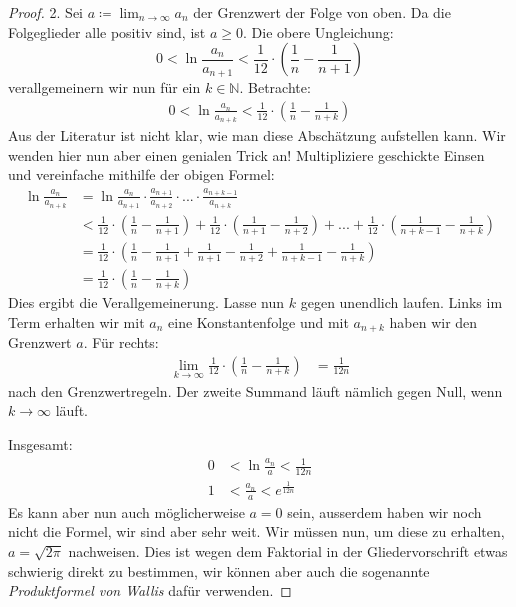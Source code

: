 \documentclass[10pt,fleqn]{article}
\theoremstyle{definition}
\theoremstyle{remark}
\begin{document}
\begin{proof}
    2. Sei \(a \coloneqq \lim_{n\to\infty} a_n\) der Grenzwert der Folge von oben. Da die Folgeglieder alle positiv sind, ist \(a \geq 0\). Die obere Ungleichung:
    \[
        0 < \ln{\frac{a_n}{a_{n+1}}} < \frac{1}{12} \cdot \left(\frac{1}{n}-\frac{1}{n+1}\right)
    \]
    verallgemeinern wir nun für ein \(k \in \mathbb{N}\). Betrachte:
    \begin{align*}
        0 < \ln{\frac{a_n}{a_{n+k}}} < \frac{1}{12} \cdot \left(\frac{1}{n}-\frac{1}{n+k}\right)
    \end{align*}
    Aus der Literatur ist nicht klar, wie man diese Abschätzung aufstellen kann. Wir wenden hier nun aber einen genialen Trick an! Multipliziere geschickte Einsen und vereinfache mithilfe der obigen Formel:
    \begin{align*}
        \ln{\frac{a_n}{a_{n+k}}} &= \ln{\frac{a_n}{a_{n+1}} \cdot \frac{a_{n+1}}{a_{n+2}} \cdot ... \cdot \frac{a_{n+k-1}}{a_{n+k}}}\\
        &< \frac{1}{12} \cdot \left(\frac{1}{n}-\frac{1}{n+1}\right) + \frac{1}{12} \cdot \left(\frac{1}{n+1}-\frac{1}{n+2}\right) + ... + \frac{1}{12} \cdot \left(\frac{1}{n+k-1}-\frac{1}{n+k}\right)\\
        &= \frac{1}{12} \cdot \left(\frac{1}{n}-\frac{1}{n+1} + \frac{1}{n+1}-\frac{1}{n+2} + \frac{1}{n+k-1}-\frac{1}{n+k}\right)\\
        &= \frac{1}{12} \cdot \left(\frac{1}{n}-\frac{1}{n+k}\right)
    \end{align*}
    Dies ergibt die Verallgemeinerung. Lasse nun \(k\) gegen unendlich laufen. Links im Term erhalten wir mit \(a_n\) eine Konstantenfolge und mit \(a_{n+k}\) haben wir den Grenzwert \(a\). Für rechts:
    \begin{align*}
        \lim_{k\to\infty} \frac{1}{12} \cdot \left(\frac{1}{n}-\frac{1}{n+k}\right) &= \frac{1}{12n}
    \end{align*}
    nach den Grenzwertregeln. Der zweite Summand läuft nämlich gegen Null, wenn \(k\to\infty\) läuft.
    
    Insgesamt:
    \begin{align*}
        0 &< \ln{\frac{a_n}{a}} < \frac{1}{12n}\\
        1 &< \frac{a_n}{a} < e^{\frac{1}{12n}}
    \end{align*}
    Es kann aber nun auch möglicherweise \(a = 0\) sein, ausserdem haben wir noch nicht die Formel, wir sind aber sehr weit. Wir müssen nun, um diese zu erhalten, \(a = \sqrt{2\pi}\) nachweisen. Dies ist wegen dem Faktorial in der Gliedervorschrift etwas schwierig direkt zu bestimmen, wir können aber auch die sogenannte \emph{Produktformel von Wallis} dafür verwenden.


\end{proof}
\end{document}

